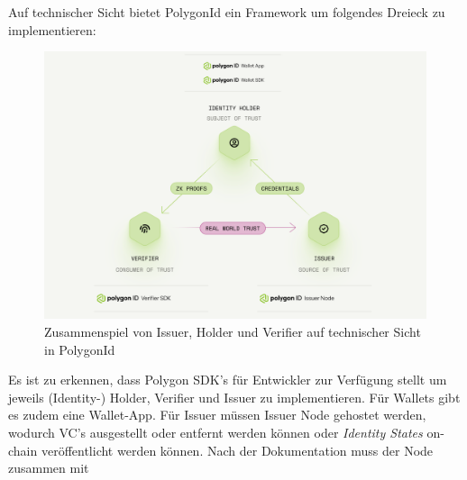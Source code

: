 Auf technischer Sicht bietet PolygonId ein Framework um folgendes Dreieck zu implementieren:
\begin{figure}[h]
	\centering
	\includegraphics[scale=0.3]{media/polygonIddreieck_inv.png}
	\caption{Zusammenspiel von Issuer, Holder und Verifier auf technischer Sicht in PolygonId \cite{ID31}}
	\label{fig:meine-grafik}
\end{figure}

Es ist zu erkennen, dass Polygon SDK's für Entwickler zur Verfügung stellt um jeweils (Identity-) Holder, Verifier und Issuer zu implementieren. Für Wallets gibt es zudem eine Wallet-App. Für Issuer müssen Issuer Node gehostet werden, wodurch VC's ausgestellt oder entfernt werden können oder \textsl{Identity States} on-chain veröffentlicht werden können. Nach der Dokumentation \cite{ID38} muss der Node zusammen mit 

